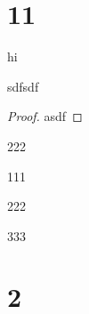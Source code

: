 \documentclass[a4paper]{scrbook}
\title{}
\author{}
\date{}
\begin{document}
\section{11}
hi 
\begin{theorem}
    sdfsdf
\end{theorem}
\begin{proof}
    asdf
\end{proof}
\begin{definition}
    222
\end{definition}

\begin{eg}
    111
\end{eg}
\begin{prop}
    222
\end{prop}
\begin{corollary}
    333
\end{corollary}

\section{2}
\end{document}
